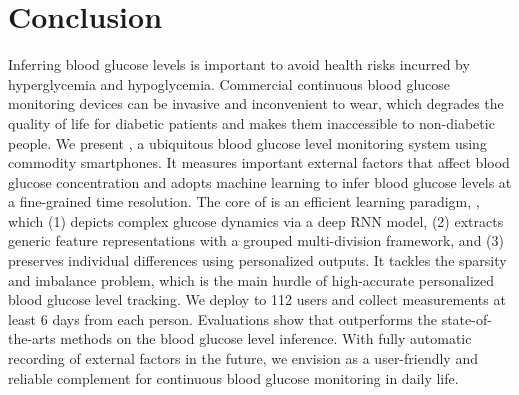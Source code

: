 
\section{Conclusion}
\label{sec:conclusion}
Inferring blood glucose levels is important to avoid health risks incurred by hyperglycemia and hypoglycemia.
Commercial continuous blood glucose monitoring devices can be invasive and inconvenient to wear, which degrades the quality of life for diabetic patients and makes them inaccessible to non-diabetic people.
We present \sysname, a ubiquitous blood glucose level monitoring system using commodity smartphones.
It measures important external factors that affect blood glucose concentration and adopts machine learning to infer blood glucose levels at a fine-grained time resolution.
The core of \sysname is an efficient learning paradigm, \modelname, which (1) depicts complex glucose dynamics via a deep RNN model, (2) extracts generic feature representations with a grouped multi-division framework, and (3) preserves individual differences using personalized outputs.
It tackles the sparsity and imbalance problem, which is the main hurdle of high-accurate personalized blood glucose level tracking.
\textcolor[rgb]{1.00,0.00,0.00}{We deploy \sysname to 112 users and collect measurements at least 6 days from each person.}
Evaluations show that \modelname outperforms the state-of-the-arts methods on the blood glucose level inference.
With fully automatic recording of external factors in the future, we envision \sysname as a user-friendly and reliable complement for continuous blood glucose monitoring in daily life.

